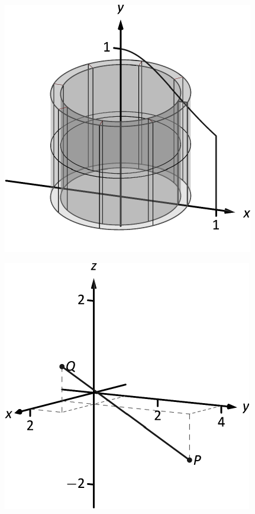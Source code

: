 \documentclass[10pt]{article}
\begin{document}
\includegraphics{figshell_intro_d_3DBW.pdf}
\texttt{}

\includegraphics{figspace1_3DBW.pdf}
\texttt{}
\end{document}
